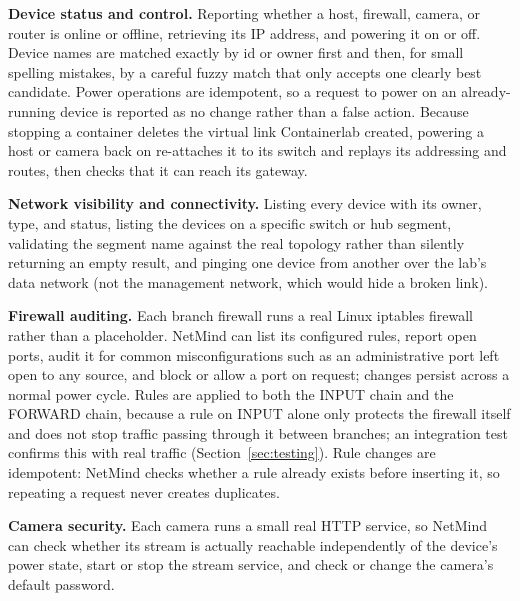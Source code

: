 \textbf{Device status and control.} Reporting whether a host, firewall,
camera, or router is online or offline, retrieving its IP address, and
powering it on or off. Device names are matched exactly by id or owner first
and then, for small spelling mistakes, by a careful fuzzy match that only
accepts one clearly best candidate. Power operations are idempotent, so a
request to power on an already-running device is reported as no change
rather than a false action. Because stopping a container deletes the virtual
link Containerlab created, powering a host or camera back on re-attaches it
to its switch and replays its addressing and routes, then checks that it can
reach its gateway.

\textbf{Network visibility and connectivity.} Listing every device with its
owner, type, and status, listing the devices on a specific switch or hub
segment, validating the segment name against the real topology rather than
silently returning an empty result, and pinging one device from another over
the lab's data network (not the management network, which would hide a
broken link).

\textbf{Firewall auditing.} Each branch firewall runs a real Linux iptables
firewall rather than a placeholder. NetMind can list its configured rules,
report open ports, audit it for common misconfigurations such as an
administrative port left open to any source, and block or allow a port on
request; changes persist across a normal power cycle. Rules are applied to
both the INPUT chain and the FORWARD chain, because a rule on INPUT alone
only protects the firewall itself and does not stop traffic passing through
it between branches; an integration test confirms this with real traffic
(Section~\ref{sec:testing}). Rule changes are idempotent: NetMind checks
whether a rule already exists before inserting it, so repeating a request
never creates duplicates.

\textbf{Camera security.} Each camera runs a small real HTTP service, so
NetMind can check whether its stream is actually reachable independently of
the device's power state, start or stop the stream service, and check or
change the camera's default password.


